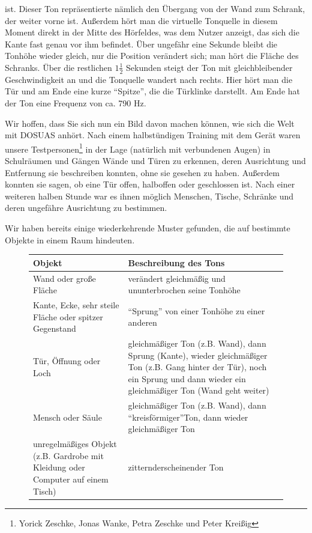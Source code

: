 \documentclass[a4paper,12pt,ngerman]{scrartcl}
\begin{document}
ist. Dieser Ton repräsentierte nämlich den Übergang von der Wand zum Schrank, der weiter vorne ist. Außerdem hört
man die virtuelle Tonquelle in diesem Moment direkt in der Mitte des Hörfeldes, was dem Nutzer anzeigt, das sich
die Kante fast genau vor ihm befindet. Über ungefähr eine Sekunde bleibt die Tonhöhe wieder gleich, nur die Position
verändert sich; man hört die Fläche des Schranks. Über die restlichen $1\frac{1}{2}$ Sekunden steigt der Ton mit 
gleichbleibender Geschwindigkeit an und die Tonquelle wandert nach rechts.
Hier hört man die Tür und am Ende eine kurze \enquote{Spitze}, die die Türklinke darstellt. Am Ende hat der Ton
eine Frequenz von ca. 790 Hz.\par 
Wir hoffen, dass Sie sich nun ein Bild davon machen können, wie sich die Welt mit DOSUAS anhört. Nach einem
halbstündigen Training mit dem Gerät waren unsere Testpersonen\footnote{Yorick Zeschke, Jonas Wanke, Petra Zeschke und Peter Kreißig} in der Lage (natürlich mit verbundenen Augen) in Schulräumen und Gängen
Wände und Türen zu erkennen, deren Ausrichtung und Entfernung sie beschreiben konnten, ohne sie gesehen zu haben.
Außerdem konnten sie sagen, ob eine Tür offen, halboffen oder geschlossen ist. Nach einer weiteren halben Stunde
war es ihnen möglich Menschen, Tische, Schränke und deren ungefähre Ausrichtung zu bestimmen. \par
Wir haben bereits einige wiederkehrende Muster gefunden, die auf bestimmte Objekte in einem Raum hindeuten. 
\begin{figure}[h]
	\begin{tabular}{| p{} | p{} |}
		\hline
		Objekt & Beschreibung des Tons \\ \hline
		Wand oder große Fläche & verändert gleichmäßig und ununterbrochen seine Tonhöhe \\ \hline
		Kante, Ecke, sehr steile Fläche oder spitzer Gegenstand & \enquote{Sprung} von einer Tonhöhe zu einer 
		anderen \\ \hline
		Tür, Öffnung oder Loch & gleichmäßiger Ton (z.B. Wand), dann Sprung (Kante), wieder gleichmäßiger Ton
		(z.B. Gang hinter der Tür), noch ein Sprung und dann wieder ein gleichmäßiger Ton (Wand geht weiter) \\ \hline 
		Mensch oder Säule & gleichmäßiger Ton (z.B. Wand), dann \enquote{kreisförmiger}\footnotemark Ton, dann wieder gleichmäßiger Ton \\ \hline
		unregelmäßiges Objekt (z.B. Gardrobe mit Kleidung oder Computer auf einem Tisch) & zitternd\footnotemark erscheinender Ton \\ \hline 
	\end{tabular}
\end{figure} \par
\end{document}

